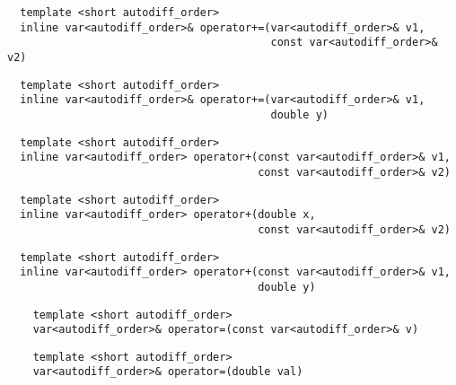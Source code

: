 \begin{tcolorbox}[colback=white,colframe=gray90, coltitle=black,boxrule=3pt,
fonttitle=\bfseries,title=Operator Addition Assignment]

\begin{verbatim}
  template <short autodiff_order>
  inline var<autodiff_order>& operator+=(var<autodiff_order>& v1,
                                         const var<autodiff_order>& v2)
\end{verbatim}

\begin{verbatim}
  template <short autodiff_order>
  inline var<autodiff_order>& operator+=(var<autodiff_order>& v1,
                                         double y)
\end{verbatim}

\end{tcolorbox}

\begin{tcolorbox}[colback=white,colframe=gray90, coltitle=black,boxrule=3pt,
fonttitle=\bfseries,title=Operator Addition]

\begin{verbatim}
  template <short autodiff_order>
  inline var<autodiff_order> operator+(const var<autodiff_order>& v1,
                                       const var<autodiff_order>& v2)
\end{verbatim}

\begin{verbatim}
  template <short autodiff_order>
  inline var<autodiff_order> operator+(double x,
                                       const var<autodiff_order>& v2)
\end{verbatim}

\begin{verbatim}
  template <short autodiff_order>
  inline var<autodiff_order> operator+(const var<autodiff_order>& v1,
                                       double y)
\end{verbatim}

\end{tcolorbox}

\begin{tcolorbox}[colback=white,colframe=gray90, coltitle=black,boxrule=3pt,
fonttitle=\bfseries,title=Operator Assignment]

\begin{verbatim}
    template <short autodiff_order>
    var<autodiff_order>& operator=(const var<autodiff_order>& v)
\end{verbatim}

\begin{verbatim}
    template <short autodiff_order>
    var<autodiff_order>& operator=(double val)
\end{verbatim}

\end{tcolorbox}

